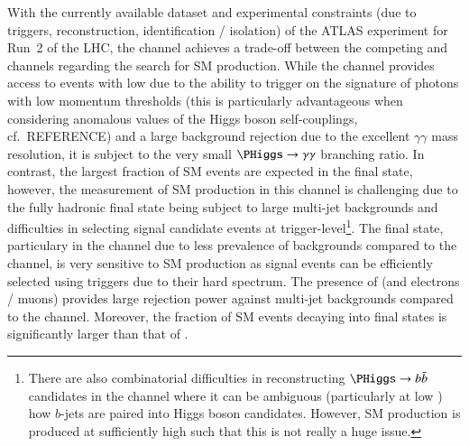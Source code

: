 With the currently available dataset and experimental constraints (due
to triggers, reconstruction, identification / isolation) of the ATLAS
experiment for Run~2 of the LHC, the \bbtautau channel achieves a
trade-off between the competing \bbyy and \bbbb channels regarding the
search for SM \HH production. While the \bbyy channel provides access
to events with low \mHH due to the ability to trigger on the signature
of photons with low momentum thresholds (this is particularly
advantageous when considering anomalous values of the Higgs boson
self-couplings, cf.~REFERENCE) and a large background rejection due to
the excellent $\gamma\gamma$ mass resolution, it is subject to the
very small $\PHiggs \to \gamma\gamma$ branching ratio. In contrast,
the largest fraction of SM \HH events are expected in the \bbbb final
state, however, the measurement of SM \HH production in this channel
is challenging due to the fully hadronic final state being subject to
large multi-jet backgrounds and difficulties in selecting signal
candidate events at trigger-level\footnote{There are also
  combinatorial difficulties in reconstructing $\PHiggs \to \bbbar$
  candidates in the \bbbb channel where it can be ambiguous
  (particularly at low \mHH) how $b$-jets are paired into Higgs boson
  candidates. However, SM \HH production is produced at sufficiently
  high \mHH such that this is not really a huge issue.}. The \bbtautau
final state, particulary in the \hadhad channel due to less prevalence
of \ttbar backgrounds compared to the \lephad channel, is very
sensitive to SM \HH production as signal events can be efficiently
selected using \tauhadvis triggers due to their hard \mHH
spectrum. The presence of \tauhadvis (and electrons / muons) provides
large rejection power against multi-jet backgrounds compared to the
\bbbb channel. Moreover, the fraction of SM \HH events decaying into
\bbtautau final states is significantly larger than that of \bbyy.

